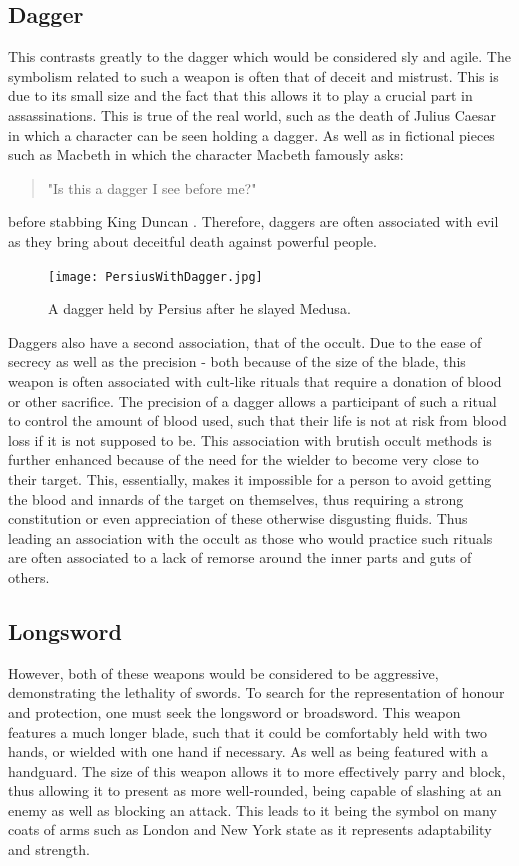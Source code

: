 \documentclass{article}
\begin{document}
\subsection{Dagger} \label{daggerSymbol}
This contrasts greatly to the dagger which would be considered sly and agile. The symbolism related to such a weapon is often that of deceit and mistrust. This is due to its small size and the fact that this allows it to play a crucial part in assassinations. This is true of the real world, such as the death of Julius Caesar \parencite{caesar} in which a character can be seen holding a dagger. As well as in fictional pieces such as Macbeth in which the character Macbeth famously asks: \begin{quote}
    "Is this a dagger I see before me?"
\end{quote}
before stabbing King Duncan \parencite{macbeth}. Therefore, daggers are often associated with evil as they bring about deceitful death against powerful people.

\begin{figure}[h]
    \centering
    \texttt{[image: PersiusWithDagger.jpg]}
    \caption{A dagger held by Persius after he slayed Medusa.}
    \label{fig:PersiusDagger}
\end{figure}

Daggers also have a second association, that of the occult. Due to the ease of secrecy as well as the precision - both because of the size of the blade, this weapon is often associated with cult-like rituals that require a donation of blood or other sacrifice. The precision of a dagger allows a participant of such a ritual to control the amount of blood used, such that their life is not at risk from blood loss if it is not supposed to be. This association with brutish occult methods is further enhanced because of the need for the wielder to become very close to their target. This, essentially, makes it impossible for a person to avoid getting the blood and innards of the target on themselves, thus requiring a strong constitution or even appreciation of these otherwise disgusting fluids. Thus leading an association with the occult as those who would practice such rituals are often associated to a lack of remorse around the inner parts and guts of others.

\subsection{Longsword} \label{longswordSymbol}
However, both of these weapons would be considered to be aggressive, demonstrating the lethality of swords. To search for the representation of honour and protection, one must seek the longsword or broadsword. This weapon features a much longer blade, such that it could be comfortably held with two hands, or wielded with one hand if necessary. As well as being featured with a handguard. The size of this weapon allows it to more effectively parry and block, thus allowing it to present as more well-rounded, being capable of slashing at an enemy as well as blocking an attack. This leads to it being the symbol on many coats of arms such as London \parencite{fox1894book} and New York state \parencite{newyorkflag} as it represents adaptability and strength.
\end{document}
